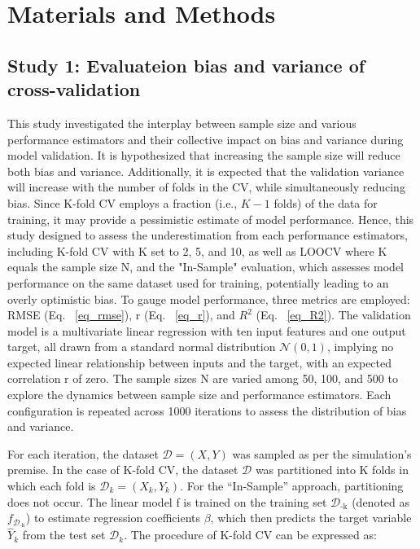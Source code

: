 \section{Materials and Methods}

\subsection{Study 1: Evaluateion bias and variance of cross-validation}

This study investigated the interplay between sample size and various performance estimators and their collective impact on bias and variance during model validation. It is hypothesized that increasing the sample size will reduce both bias and variance. Additionally, it is expected that the validation variance will increase with the number of folds in the CV, while simultaneously reducing bias. Since K-fold CV employs a fraction (i.e., $K-1$ folds) of the data for training, it may provide a pessimistic estimate of model performance. Hence, this study designed to assess the underestimation from each performance estimators, including K-fold CV with K set to 2, 5, and 10, as well as LOOCV where K equals the sample size N, and the "In-Sample" evaluation, which assesses model performance on the same dataset used for training, potentially leading to an overly optimistic bias. To gauge model performance, three metrics are employed: RMSE (Eq. ~\ref{eq_rmse}), r (Eq. ~\ref{eq_r}), and $R^2$ (Eq. ~\ref{eq_R2}). The validation model is a multivariate linear regression with ten input features and one output target, all drawn from a standard normal distribution $\mathcal{N}(0, 1)$, implying no expected linear relationship between inputs and the target, with an expected correlation r of zero. The sample sizes N are varied among 50, 100, and 500 to explore the dynamics between sample size and performance estimators. Each configuration is repeated across 1000 iterations to assess the distribution of bias and variance.

For each iteration, the dataset $\mathcal{D}={(X, Y)}$ was sampled as per the simulation’s premise. In the case of K-fold CV, the dataset $\mathcal{D}$ was partitioned into K folds in which each fold is $\mathcal{D}_k={(X_k, Y_k)}$. For the “In-Sample” approach, partitioning does not occur. The linear model f is trained on the training set $\mathcal{D}_\text{-k}$ (denoted as $f_{\mathcal{D}_{\text{-k}}}$) to estimate regression coefficients $\beta$, which then predicts the target variable ${\hat{Y}}_k$ from the test set $\mathcal{D}_k$. The procedure of K-fold CV can be expressed as:


